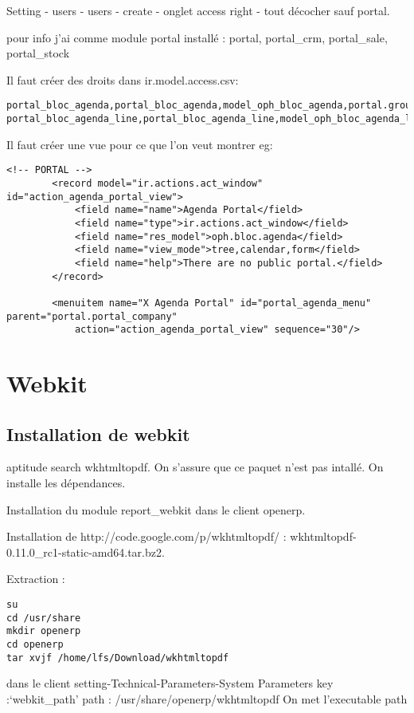 \documentclass[12pt,a4paper]{article}
\begin{document}
Setting - users - users - create - onglet access right - tout décocher sauf portal.

pour info j'ai comme module portal installé : portal, portal\_crm, portal\_sale, portal\_stock

Il faut créer des droits dans ir.model.access.csv:
\begin{verbatim}
portal_bloc_agenda,portal_bloc_agenda,model_oph_bloc_agenda,portal.group_portal,1,0,0,0
portal_bloc_agenda_line,portal_bloc_agenda_line,model_oph_bloc_agenda_line,portal.group_portal,1,0,0,0
\end{verbatim}



Il faut créer une vue pour ce que l'on veut montrer eg:

\begin{verbatim}
<!-- PORTAL -->
        <record model="ir.actions.act_window" id="action_agenda_portal_view">
            <field name="name">Agenda Portal</field>
            <field name="type">ir.actions.act_window</field>
            <field name="res_model">oph.bloc.agenda</field>
            <field name="view_mode">tree,calendar,form</field>
            <field name="help">There are no public portal.</field>
        </record>

        <menuitem name="X Agenda Portal" id="portal_agenda_menu" parent="portal.portal_company"
            action="action_agenda_portal_view" sequence="30"/>
\end{verbatim}

\section{Webkit}
\label{sec:webkit}


\subsection{Installation de webkit}
\label{sec:install_webkit}


aptitude search wkhtmltopdf. On s'assure que ce paquet n'est pas intallé.
On installe les dépendances. 

Installation du module report\_webkit dans le client openerp.

Installation de http://code.google.com/p/wkhtmltopdf/ : wkhtmltopdf-0.11.0\_rc1-static-amd64.tar.bz2.

Extraction : 
\begin{verbatim}
su
cd /usr/share 
mkdir openerp
cd openerp
tar xvjf /home/lfs/Download/wkhtmltopdf
\end{verbatim}

dans le client 
setting-Technical-Parameters-System Parameters
key :‘webkit\_path’
path : /usr/share/openerp/wkhtmltopdf On met l'executable path
\end{document}

